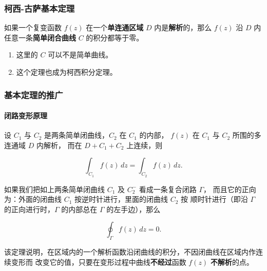 \subsubsection{柯西-古萨基本定理}
\label{柯西-古萨基本定理}
如果一个复变函数 \(f(z)\) 在一个\textbf{单连通区域} \(D\) 内是\textbf{解析}的，那么 \(f(z)\) 沿 \(D\) 内任意一条\textbf{简单闭合曲线} \(C\) 的积分都等于零。

\begin{tcolorbox}[title={Note},colback=red!5!white
,colframe=red!75!black
,colbacktitle=yellow!50!red
,coltitle=red!25!black, fonttitle=\bfseries,subtitle style={boxrule=0.4pt, colback=yellow!50!red!25!white}]
\begin{enumerate}
\item 这里的 \(C\) 可以不是简单曲线。
\item 这个定理也成为柯西积分定理。
\end{enumerate}

\end{tcolorbox}
\subsubsection{基本定理的推广}
\label{基本定理的推广}
\paragraph{闭路变形原理}
\label{闭路变形原理}
设 \(C_{1}\) 与 \(C_{2}\) 是两条简单闭曲线，\(C_{2}\) 在 \(C_{1}\) 的内部，
\(f(z)\) 在 \(C_{1}\) 与 \(C_{2}\) 所围的多连通域 \(D\) 内解析，
而在 \(D + C_{1} + C_{2}\) 上连续，则

\[
\int_{C_{1}} f(z) \, dz = \int_{C_{2}} f(z) \, dz.
\]

\begin{tcolorbox}[title={注：},colback=red!5!white
,colframe=red!75!black
,colbacktitle=yellow!50!red
,coltitle=red!25!black, fonttitle=\bfseries,subtitle style={boxrule=0.4pt, colback=yellow!50!red!25!white}]
如果我们把如上两条简单闭曲线 \(C_{1}\) 及 \(C_{2}^{-}\) 看成一条复合闭路 \(\Gamma\)，
而且它的正向为：外面的闭曲线 \(C_{1}\) 按逆时针进行，里面的闭曲线 \(C_{2}\) 按
顺时针进行（即沿 \(\Gamma\) 的正向进行时，\(\Gamma\) 的内部总在 \(\Gamma\) 的左手边），那么

\[
\oint_{\Gamma} f(z) \, dz = 0.
\]

该定理说明，在区域内的一个解析函数沿闭曲线的积分，不因闭曲线在区域内作连续变形而
改变它的值，只要在变形过程中曲线\textbf{不经过}函数 \(f(z)\) \textbf{不解析}的点。

\end{tcolorbox}
